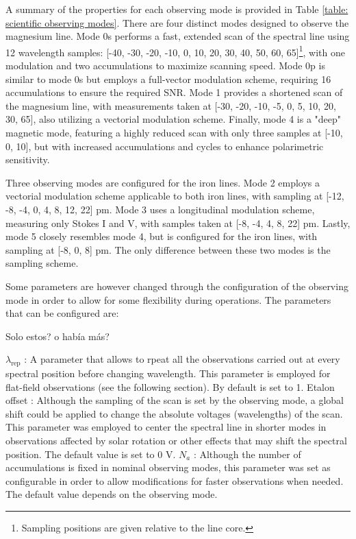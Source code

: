 A summary of the properties for each observing mode is provided in Table \ref{table: scientific observing modes}. There are four distinct modes designed to observe the magnesium line. Mode 0s performs a fast, extended scan of the spectral line using 12 wavelength samples: [-40, -30, -20, -10, 0, 10, 20, 30, 40, 50, 60, 65]\footnote{Sampling positions are given relative to the line core.}, with one modulation and two accumulations to maximize scanning speed. Mode 0p is similar to mode 0s but employs a full-vector modulation scheme, requiring 16 accumulations to ensure the required SNR. Mode 1 provides a shortened scan of the magnesium line, with measurements taken at [-30, -20, -10, -5, 0, 5, 10, 20, 30, 65], also utilizing a vectorial modulation scheme. Finally, mode 4 is a "deep" magnetic mode, featuring a highly reduced scan with only three samples at [-10, 0, 10], but with increased accumulations and cycles to enhance polarimetric sensitivity. 

Three observing modes are configured for the iron lines. Mode 2 employs a vectorial modulation scheme applicable to both iron lines, with sampling at [-12, -8, -4, 0, 4, 8, 12, 22] pm. Mode 3 uses a longitudinal modulation scheme, measuring only Stokes I and V, with samples taken at [-8, -4, 4, 8, 22] pm. Lastly, mode 5 closely resembles mode 4, but is configured for the iron lines, with sampling at [-8, 0, 8] pm. The only difference between these two modes is the sampling scheme.

Some parameters are however changed through the configuration of the observing mode in order to allow for some flexibility during operations. The parameters that can be configured are:

Solo estos? o había más? 
\begin{itemize}
    \Myitem $\lambda _ {\text{rep}}$ : A parameter that allows to rpeat all the observations carried out at every spectral position before changing wavelength. This parameter is employed for flat-field observations (see the following section). By default is set to 1.
    \Myitem Etalon offset : Although the sampling of the scan is set by the observing mode, a global shift could be applied to change the absolute voltages (wavelengths) of the scan. This parameter was employed to center the spectral line in shorter modes in observations affected by solar rotation or other effects that may shift the spectral position. The default value is set to 0 V.
    \Myitem $N_a$ : Although the number of accumulations is fixed in nominal observing modes, this parameter was set as configurable in order to allow modifications for faster observations when needed. The  default value depends on the observing mode.  
\end{itemize}

